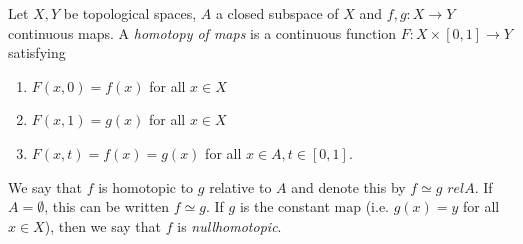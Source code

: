\documentclass[12pt]{article}
\begin{document}
Let $X,Y$ be topological spaces, $A$ a closed subspace of $X$ and $f,g:X \to Y$ continuous maps. A \emph{homotopy of maps} is a continuous function $F:X \times [0,1] \to Y$ satisfying
\begin{enumerate}
\item $F(x,0)=f(x)$ for all $x \in X$
\item $F(x,1)=g(x)$ for all $x \in X$
\item $F(x,t)=f(x)=g(x)$ for all $x \in A, t\in [0,1]$.
\end{enumerate}
We say that $f$ is homotopic to $g$ relative to $A$ and denote this by $f \simeq g$ $rel A$. If $A=\emptyset$, this can be written $f \simeq g$. If $g$ is the constant map (i.e. $g(x)=y$  for all $x \in X$), then we say that $f$ is \emph{nullhomotopic}.
\end{document}

